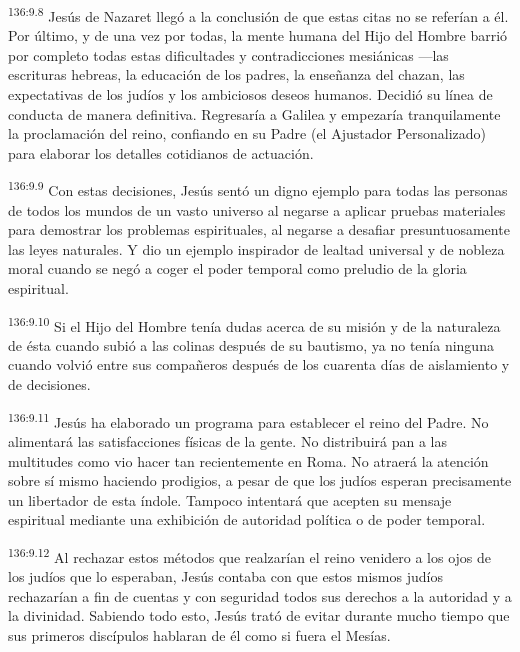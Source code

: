 \par 
\textsuperscript{136:9.8} Jesús de Nazaret llegó a la conclusión de que estas citas no se referían a él. Por último, y de una vez por todas, la mente humana del Hijo del Hombre barrió por completo todas estas dificultades y contradicciones mesiánicas ---las escrituras hebreas, la educación de los padres, la enseñanza del chazan, las expectativas de los judíos y los ambiciosos deseos humanos. Decidió su línea de conducta de manera definitiva. Regresaría a Galilea y empezaría tranquilamente la proclamación del reino, confiando en su Padre (el Ajustador Personalizado) para elaborar los detalles cotidianos de actuación.

\par 
\textsuperscript{136:9.9} Con estas decisiones, Jesús sentó un digno ejemplo para todas las personas de todos los mundos de un vasto universo al negarse a aplicar pruebas materiales para demostrar los problemas espirituales, al negarse a desafiar presuntuosamente las leyes naturales. Y dio un ejemplo inspirador de lealtad universal y de nobleza moral cuando se negó a coger el poder temporal como preludio de la gloria espiritual.

\par 
\textsuperscript{136:9.10} Si el Hijo del Hombre tenía dudas acerca de su misión y de la naturaleza de ésta cuando subió a las colinas después de su bautismo, ya no tenía ninguna cuando volvió entre sus compañeros después de los cuarenta días de aislamiento y de decisiones.

\par 
\textsuperscript{136:9.11} Jesús ha elaborado un programa para establecer el reino del Padre. No alimentará las satisfacciones físicas de la gente. No distribuirá pan a las multitudes como vio hacer tan recientemente en Roma. No atraerá la atención sobre sí mismo haciendo prodigios, a pesar de que los judíos esperan precisamente un libertador de esta índole. Tampoco intentará que acepten su mensaje espiritual mediante una exhibición de autoridad política o de poder temporal.

\par 
\textsuperscript{136:9.12} Al rechazar estos métodos que realzarían el reino venidero a los ojos de los judíos que lo esperaban, Jesús contaba con que estos mismos judíos rechazarían a fin de cuentas y con seguridad todos sus derechos a la autoridad y a la divinidad. Sabiendo todo esto, Jesús trató de evitar durante mucho tiempo que sus primeros discípulos hablaran de él como si fuera el Mesías.

